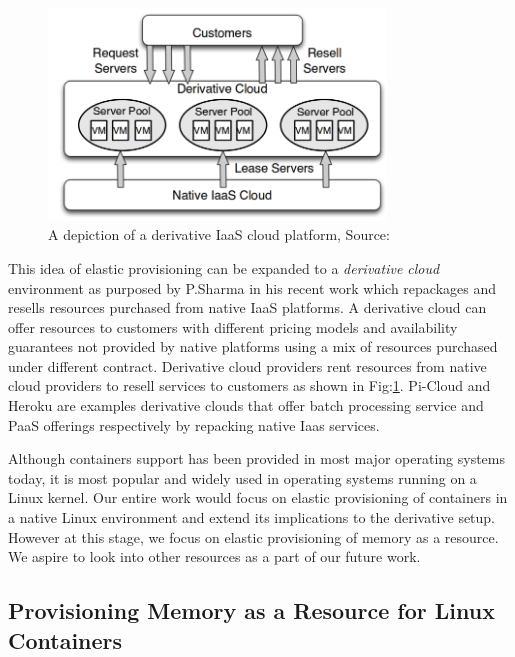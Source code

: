     \begin{figure}
      \centering
      \includegraphics[width=0.8\textwidth]{images/derivative_cloud.png}
      \caption{A depiction of a derivative IaaS cloud platform, Source:\cite{sharma2015spotcheck}}
      \label{img_derivative_cloud}
    \end{figure}

    This idea of elastic provisioning can be expanded to a \textit{derivative cloud} environment as purposed by P.Sharma in his recent work 
\cite{sharma2015spotcheck} which repackages and resells resources purchased from native IaaS platforms. A derivative cloud can offer 
resources to customers with different pricing models and availability guarantees not provided by native platforms using a mix of resources  
purchased under different contract. Derivative cloud providers rent resources from native cloud providers to resell services to customers 
as shown in Fig:\ref{img_derivative_cloud}. Pi-Cloud\cite{picloud} and Heroku\cite{heroku} are examples derivative clouds that offer batch 
processing service and PaaS offerings respectively by repacking native Iaas services. 

    Although containers support has been provided in most major operating systems today, it is most popular and widely used in operating 
systems running on a Linux kernel. Our entire work would focus on elastic provisioning of containers in a native Linux environment and 
extend its implications to the derivative setup. However at this stage, we focus on elastic provisioning of memory as a resource. We aspire 
to look into other resources as a part of our future work.
   
    \subsection{Provisioning Memory as a Resource for Linux Containers}
  
